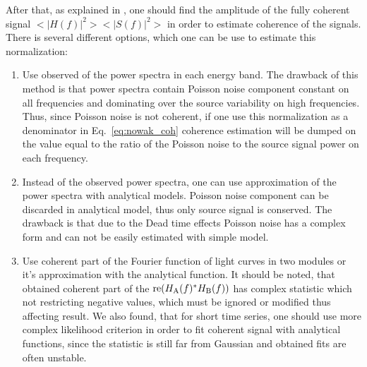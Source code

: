 \documentclass[a4paper,fleqn,usenatbib]{mnras}
\begin{document}
After that, as explained in \citep{nowak99}, one should find the amplitude of the fully coherent signal $<|H(f)|^2><|S(f)|^2>$ in order to estimate coherence of the signals. 
There is several different options, which one can be use to estimate this normalization:
\begin{enumerate}
        \item Use observed of the power spectra in each energy band. 
                 The drawback of this method is that power spectra contain Poisson noise component constant on all frequencies and dominating over the source variability on high frequencies. 
                 Thus, since Poisson noise is not coherent,  if one use this normalization as a denominator in Eq.~\ref{eq:nowak_coh} coherence estimation will be dumped on the value equal to the ratio of the Poisson noise to the source signal power on each frequency.
        \item Instead of the observed power spectra, one can use approximation of the power spectra with analytical models. 
                Poisson noise component can be discarded in analytical model, thus only source signal is conserved. 
                The drawback is that due to the Dead time effects Poisson noise has a complex form and can not be easily estimated with simple model.
        \item Use coherent part of the Fourier function of light curves in two modules \citep{2015ApJ...800..109B} or it's approximation with the analytical function. 
                It should be noted, that obtained coherent part of the ${\rm re}(H_{\rm A}(f)^*H_{\rm B}(f))$ has complex statistic which not restricting negative values, which must be ignored or modified thus affecting result.  
                We also found, that for short time series, one should use more complex likelihood criterion in order to fit coherent signal with analytical functions, since the statistic is still far from Gaussian and obtained fits are often unstable.
\end{enumerate}
\end{document}
